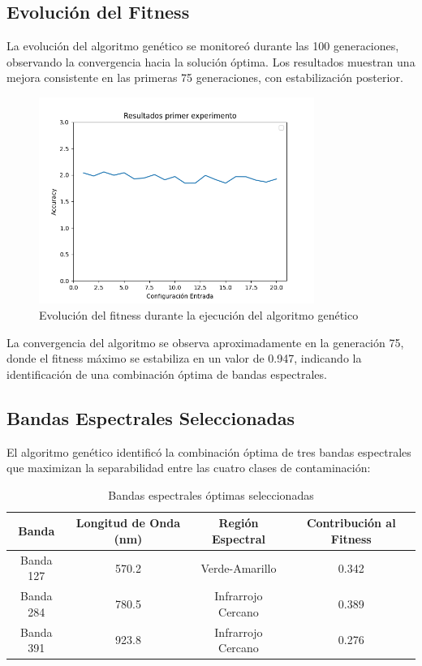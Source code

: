 \subsection{Evolución del Fitness}

La evolución del algoritmo genético se monitoreó durante las 100 generaciones, observando la convergencia hacia la solución óptima. Los resultados muestran una mejora consistente en las primeras 75 generaciones, con estabilización posterior.

\begin{figure}[h!]
\centering
\includegraphics[width=0.8\textwidth]{images/resultFirstEval.png}
\caption{Evolución del fitness durante la ejecución del algoritmo genético}
\label{fig:fitness_evolution}
\end{figure}

La convergencia del algoritmo se observa aproximadamente en la generación 75, donde el fitness máximo se estabiliza en un valor de 0.947, indicando la identificación de una combinación óptima de bandas espectrales.

\subsection{Bandas Espectrales Seleccionadas}

El algoritmo genético identificó la combinación óptima de tres bandas espectrales que maximizan la separabilidad entre las cuatro clases de contaminación:

\begin{table}[h!]
\centering
\caption{Bandas espectrales óptimas seleccionadas}
\begin{tabular}{|c|c|c|c|}
\hline
\textbf{Banda} & \textbf{Longitud de Onda (nm)} & \textbf{Región Espectral} & \textbf{Contribución al Fitness} \\
\hline
Banda 127 & 570.2 & Verde-Amarillo & 0.342 \\
\hline
Banda 284 & 780.5 & Infrarrojo Cercano & 0.389 \\
\hline
Banda 391 & 923.8 & Infrarrojo Cercano & 0.276 \\
\hline
\end{tabular}
\label{tab:selected_bands}
\end{table}

